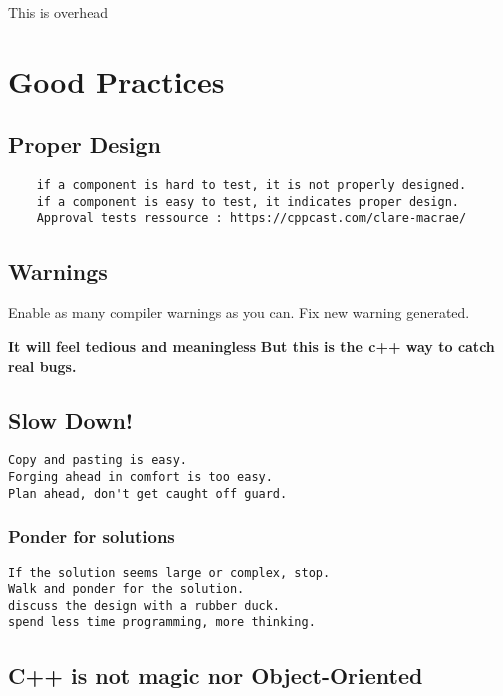 \documentclass[openany]{report}
\begin{document}
This is overhead

\chapter{Good Practices}

\section{Proper Design}

\begin{verbatim}
    if a component is hard to test, it is not properly designed. 
    if a component is easy to test, it indicates proper design. 
    Approval tests ressource : https://cppcast.com/clare-macrae/ 
\end{verbatim}

\section{Warnings}

Enable as many compiler warnings as you can. 
Fix new warning generated. 

\textbf{It will feel tedious and meaningless}
\textbf{But this is the c++ way to catch real bugs.}

\section{Slow Down!}

\begin{verbatim}
Copy and pasting is easy. 
Forging ahead in comfort is too easy.
Plan ahead, don't get caught off guard. 
\end{verbatim}

\subsection{Ponder for solutions}

\begin{verbatim}
If the solution seems large or complex, stop. 
Walk and ponder for the solution. 
discuss the design with a rubber duck. 
spend less time programming, more thinking.
\end{verbatim}

\section{C++ is not magic nor Object-Oriented}
\end{document}
